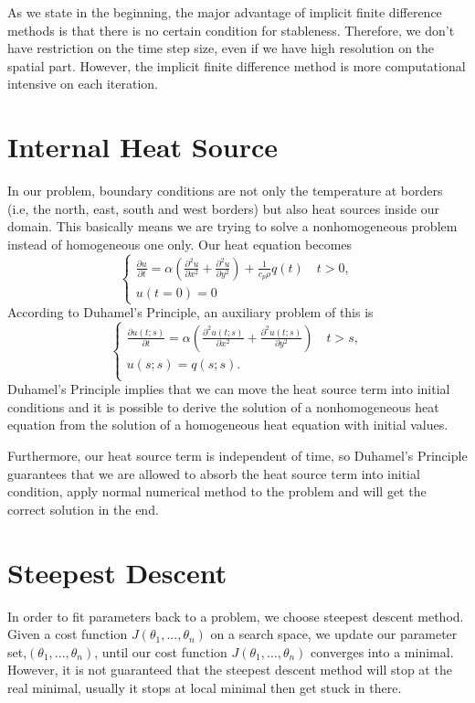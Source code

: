 \documentclass[10pt,a4paper]{report}
\begin{document}
As we state in the beginning, the major advantage of implicit finite difference methods is that there is no certain condition for stableness. Therefore, we don't have restriction on the time step size, even if we have high resolution on the spatial part. However, the implicit finite difference method is more computational intensive on each iteration.

\section{Internal Heat Source}

In our problem, boundary conditions are not only the temperature at borders (i.e, the north, east, south and west borders) but also heat sources inside our domain. This basically means we are trying to solve a nonhomogeneous problem instead of homogeneous one only. Our heat equation becomes
\[
\begin{cases}
 {\frac{\partial u}{\partial t}}=\alpha({\frac{\partial^2 u}{\partial x^2}}+{\frac{\partial^2 u}{\partial y^2}})+{\frac{1}{c_p \rho}}q(t) \quad t>0,\\
 u(t=0)=0
\end{cases}
\]  
According to Duhamel's Principle, an auxiliary problem of this is   
\[
\begin{cases}
 {\frac{\partial u(t;s)}{\partial t}}=\alpha({\frac{\partial^2 u(t;s)}{\partial x^2}}+{\frac{\partial^2 u(t;s)}{\partial y^2}}) \quad t>s,\\
 u(s;s)=q(s;s).\\
\end{cases}  
\]
Duhamel's Principle implies that we can move the heat source term into initial conditions and it is possible to derive the solution of a nonhomogeneous heat equation from the solution of a homogeneous heat equation with initial values.

Furthermore, our heat source term is independent of time, so Duhamel's Principle guarantees that we are allowed to absorb the heat source term into initial condition, apply normal numerical method to the problem and will get the correct solution in the end.

\section{Steepest Descent}

In order to fit parameters back to a problem, we choose steepest descent method. Given a cost function $J(\theta_1,...,\theta_n)$ on a search space, we update our parameter set,$(\theta_1,...,\theta_n)$, until our cost function $J(\theta_1,...,\theta_n)$ converges into a minimal. However, it is not guaranteed that the steepest descent method will stop at the real minimal, usually it stops at local minimal then get stuck in there.
\end{document}
